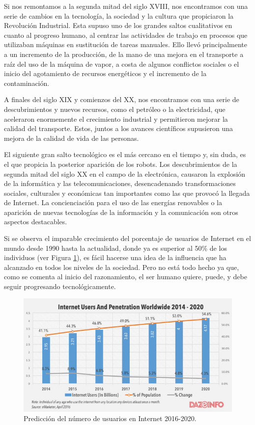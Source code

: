 \documentclass[12pt,spanish,chapterprefix, numbers=noenddot]{book}
\numberwithin{equation}{section}
\numberwithin{figure}{section}
\begin{document}
Si nos remontamos a la segunda mitad del siglo XVIII,  nos encontramos con una serie de cambios en la tecnología, la sociedad y la cultura que propiciaron la Revolución Industrial. Esta supuso uno de los grandes saltos cualitativos en cuanto al progreso humano, al centrar las actividades de trabajo en procesos que utilizaban máquinas en sustitución de tareas manuales. Ello llevó principalmente a un incremento de la producción, de la mano de una mejora en el transporte a raíz del uso de la máquina de vapor, a costa de algunos conflictos sociales o el inicio del agotamiento de recursos energéticos y el incremento de la contaminación. 

A finales del siglo XIX y comienzos del XX, nos encontramos con una serie de descubrimientos y nuevos recursos, como el petróleo o la electricidad, que aceleraron enormemente el crecimiento industrial y permitieron mejorar la calidad del transporte. Estos, juntos a los avances científicos supusieron una mejora de la calidad de vida de las personas.

El siguiente gran salto tecnológico es el más cercano en el tiempo y, sin duda, es el que propicia la posterior aparición de los robots. Los descubrimientos de la segunda mitad del siglo XX en el campo de la electrónica, causaron la explosión de la informática y las telecomunicaciones, desencadenando transformaciones sociales, culturales y económicas tan importantes como las que provocó la llegada de Internet. La concienciación para el uso de las energías renovables o la aparición de nuevas tecnologías de la información y la comunicación son otros aspectos destacables. 

Si se observa el imparable crecimiento del porcentaje de usuarios de Internet en el mundo desde 1990 hasta la actualidad, donde ya es superior al 50\% de los individuos  (ver Figura \ref{fig:internetWorldwide}), es fácil hacerse una idea de la influencia que ha alcanzado en todos los niveles de la sociedad. Pero no está todo hecho ya que, como se comenta al inicio del razonamiento, el ser humano quiere, puede, y debe seguir progresando tecnológicamente.  

\begin{figure}[hbt!]
\centering
\includegraphics[width=12cm]{Figs/internetWorldwide.jpg}
\par
\caption{\label{fig:internetWorldwide}Predicción del número de usuarios en Internet 2016-2020.}
\end{figure}
\end{document}
